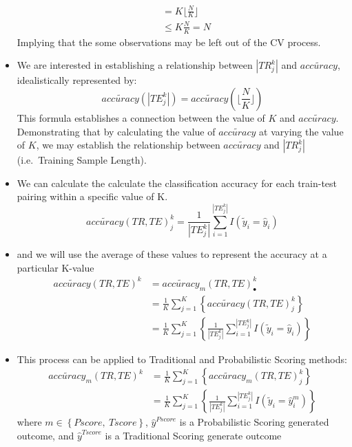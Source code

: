 \documentclass[12pt,]{article}
\begin{document}
\begin{itemize}
\begin{align*}
  &= K \Big \lfloor \frac{N}{K} \Big \rfloor \\[0.5em]
  &\leq K \frac{N}{K} = N
  \end{align*} Implying that the some observations may be left out of
  the CV process.
\item
  We are interested in establishing a relationship between
  \(|TR_{j}^{k}|\) and \(\tilde{accuracy}\), idealistically represented
  by:
  \[\tilde{accuracy}\left( |TE_{j}^{k}|  \right) = \tilde{accuracy}\left( \Big \lfloor \frac{N}{K} \Big \rfloor  \right) \]
  This formula establishes a connection between the value of \(K\) and
  \(\tilde{accuracy}\). Demonstrating that by calculating the value of
  \(\tilde{accuracy}\) at varying the value of \(K\), we may establish
  the relationship between \(\tilde{accuracy}\) and \(|TR_{j}^{k}|\)
  (i.e.~Training Sample Length).
\item
  We can calculate the calculate the classification accuracy for each
  train-test pairing within a specific value of K.
  \[\tilde{accuracy}\left(TR, TE \right)_{j}^{k}= \frac{1}{|TE_{j}^{k}|} \sum_{i=1}^{|TE_{j}^{k}|} I\left(\tilde{y}_{i}=\hat{y}_{i} \right) \]
\item
  and we will use the average of these values to represent the accuracy
  at a particular K-value \begin{eqnarray*}
    \tilde{accuracy}\left(TR, TE \right)^{k} &= \tilde{accuracy}_{m}\left(TR, TE \right)_{\bullet}^{k} \\
    &=\frac{1}{K}\sum_{j=1}^{K} \left \{ \tilde{accuracy}\left(TR, TE \right)_{j}^{k}\right \} \\
    &=  \frac{1}{K}\sum_{j=1}^{K} \left \{ \frac{1}{|TE_{j}^{k}|} \sum_{i=1}^{|TE_{j}^{k}|} I\left(\tilde{y}_{i}=\hat{y}_{i} \right) \right \}
  \end{eqnarray*}
\item
  This process can be applied to Traditional and Probabilistic Scoring
  methods: \begin{eqnarray*}
    \tilde{accuracy}_{m}\left(TR, TE \right)^{k} &= \frac{1}{K}\sum_{j=1}^{K} \left \{ \tilde{accuracy}_{m}\left(TR, TE \right)_{j}^{k}\right \} \\
    &=  \frac{1}{K}\sum_{j=1}^{K} \left \{ \frac{1}{|TE_{j}^{k}|} \sum_{i=1}^{|TE_{j}^{k}|} I\left(\tilde{y}_{i}=\hat{y}_{i}^{m} \right) \right \}
  \end{eqnarray*} where \(m\in\left \{ Pscore, \ Tscore \right \}\),
  \(\hat{y}^{Pscore}\) is a Probabilistic Scoring generated outcome, and
  \(\hat{y}^{Tscore}\) is a Traditional Scoring generate outcome

\end{itemize}
\end{document}
